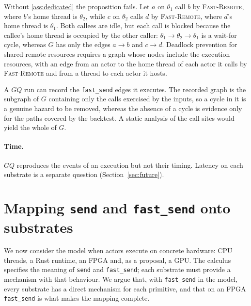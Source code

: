 \documentclass[11pt]{article}
\theoremstyle{definition}
\theoremstyle{remark}
\newcommand{\fs}{\texttt{fast\_send}}
\newcommand{\snd}{\texttt{send}}
\begin{document}
Without \cref{ass:dedicated} the proposition fails. Let $a$ on $\theta_1$ call $b$ by
\textsc{Fast-Remote}, where $b$'s home thread is $\theta_2$, while $c$ on $\theta_2$
calls $d$ by \textsc{Fast-Remote}, where $d$'s home thread is $\theta_1$. Both callees
are idle, but each call is blocked because the callee's home thread is occupied by the
other caller: $\theta_1 \to \theta_2 \to \theta_1$ is a wait-for cycle, whereas $G$ has
only the edges $a \to b$ and $c \to d$. Deadlock prevention for shared remote resources
requires a graph whose nodes include the execution resources, with an edge from an actor
to the home thread of each actor it calls by \textsc{Fast-Remote} and from a thread to
each actor it hosts.

A $\mathit{GQ}$ run can record the \fs{} edges it executes. The recorded graph is the
subgraph of $G$ containing only the calls exercised by the inputs, so a cycle in it is a
genuine hazard to be removed, whereas the absence of a cycle is evidence only for the
paths covered by the backtest. A static analysis of the call sites would yield the whole
of $G$.

\paragraph{Time.} $\mathit{GQ}$ reproduces the events of an execution but not their
timing. Latency on each substrate is a separate question (Section~\ref{sec:future}).

\section{Mapping \snd{} and \fs{} onto substrates}
\label{sec:substrates}

We now consider the model when actors execute on concrete hardware: CPU threads, a Rust
runtime, an FPGA and, as a proposal, a GPU. The calculus specifies the meaning of \snd{}
and \fs{}; each substrate must provide a mechanism with that behaviour. We argue that,
with \fs{} in the model, every substrate has a direct mechanism for each primitive, and
that on an FPGA \fs{} is what makes the mapping complete.
\end{document}
